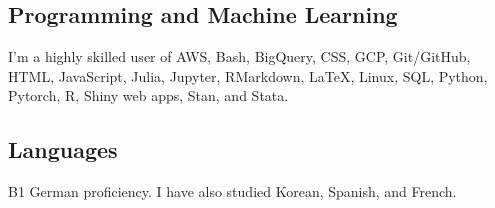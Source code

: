 \documentclass[a4paper]{article}
\begin{document}
\subsection*{Programming and Machine Learning}

I'm a highly skilled user of AWS, Bash, BigQuery, CSS, GCP, Git/GitHub, HTML, JavaScript, Julia, Jupyter, RMarkdown, LaTeX, Linux, SQL, Python, Pytorch, R, Shiny web apps, Stan, and Stata.

\subsection*{Languages}

B1 German proficiency. I have also studied Korean, Spanish, and French. 
\end{document}
